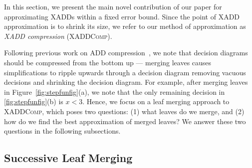 \label{sec:approx}

In this section, we present the main novel contribution of our paper
for approximating XADDs within a fixed error bound.  Since the point
of XADD approximation is to shrink its size, we refer to our method of
approximation as \emph{XADD compression} (\textsc{XADDComp}).

Following previous work on ADD compression~\cite{apricodd}, we note
that decision diagrams should be compressed from the bottom up ---
merging leaves causes simplifications to ripple upwards through a
decision diagram removing vacuous decisions and shrinking the decision
diagram.  For example, after merging leaves in
Figure~\ref{fig:stepfunfig}(a), we note that the only remaining
decision in \ref{fig:stepfunfig}(b) is $x < 3$.  Hence, we focus on a
leaf merging approach to \textsc{XADDComp}, which poses two questions:
(1) what leaves do we merge, and (2) how do we find the best
approximation of merged leaves?  We answer these two questions in the
following subsections.




\subsection{Successive Leaf Merging}


